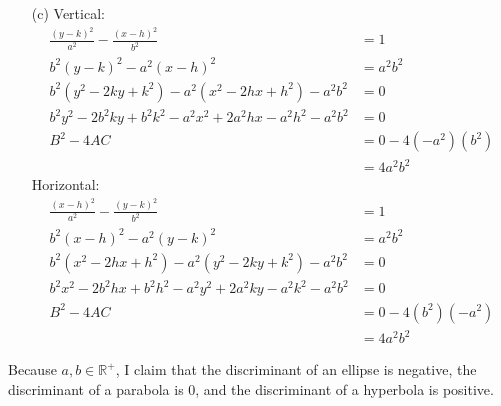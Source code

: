 \documentclass{article}
\begin{document}
\begin{itemize}
\item[(c)]
	Vertical:
	\begin{align*}
		\frac{(y-k)^2}{a^2}-\frac{(x-h)^2}{b^2}&=1 \\
		b^2(y-k)^2-a^2(x-h)^2&=a^2b^2 \\
		b^2\left(y^2-2ky+k^2\right)-a^2\left(x^2-2hx+h^2\right)-a^2b^2&=0 \\
		b^2y^2-2b^2ky+b^2k^2-a^2x^2+2a^2hx-a^2h^2-a^2b^2&=0 \\
		B^2-4AC&=0-4\left(-a^2\right)\left(b^2\right) \\
		&=\boxed{4a^2b^2}
	\end{align*}
	Horizontal:
	\begin{align*}
		\frac{(x-h)^2}{a^2}-\frac{(y-k)^2}{b^2}&=1 \\
		b^2(x-h)^2-a^2(y-k)^2&=a^2b^2 \\
		b^2\left(x^2-2hx+h^2\right)-a^2\left(y^2-2ky+k^2\right)-a^2b^2&=0 \\
		b^2x^2-2b^2hx+b^2h^2-a^2y^2+2a^2ky-a^2k^2-a^2b^2&=0 \\
		B^2-4AC&=0-4\left(b^2\right)\left(-a^2\right) \\
		&=\boxed{4a^2b^2}
	\end{align*}

\end{itemize}

Because $a,b\in\mathbb{R}^+$, I claim that the discriminant of an ellipse is negative, the discriminant of a parabola is 0, and the discriminant of a hyperbola is positive.
\end{document}
